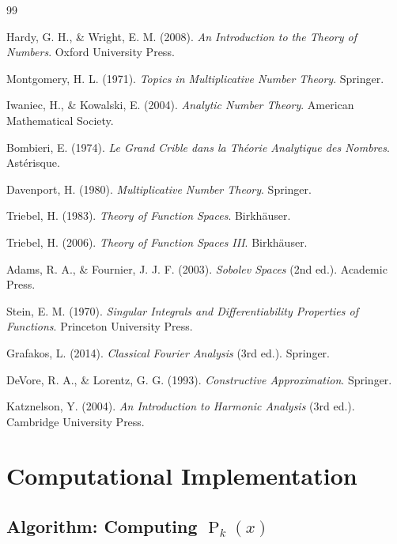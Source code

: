 ﻿\documentclass[12pt,a4paper]{report}
\theoremstyle{plain}
\theoremstyle{definition}
\DeclareMathOperator{\Pk}{P}
\begin{document}

\begin{thebibliography}{99}

Hardy, G. H., \& Wright, E. M. (2008). 
\textit{An Introduction to the Theory of Numbers}. 
Oxford University Press.

Montgomery, H. L. (1971). 
\textit{Topics in Multiplicative Number Theory}. 
Springer.

Iwaniec, H., \& Kowalski, E. (2004). 
\textit{Analytic Number Theory}. 
American Mathematical Society.

Bombieri, E. (1974). 
\textit{Le Grand Crible dans la Th\'eorie Analytique des Nombres}. 
Ast\'erisque.

Davenport, H. (1980). 
\textit{Multiplicative Number Theory}. 
Springer.

Triebel, H. (1983). 
\textit{Theory of Function Spaces}. 
Birkh\"auser.

Triebel, H. (2006). 
\textit{Theory of Function Spaces III}. 
Birkh\"auser.

Adams, R. A., \& Fournier, J. J. F. (2003). 
\textit{Sobolev Spaces} (2nd ed.). 
Academic Press.

Stein, E. M. (1970). 
\textit{Singular Integrals and Differentiability Properties of Functions}. 
Princeton University Press.

Grafakos, L. (2014). 
\textit{Classical Fourier Analysis} (3rd ed.). 
Springer.

DeVore, R. A., \& Lorentz, G. G. (1993). 
\textit{Constructive Approximation}. 
Springer.

Katznelson, Y. (2004). 
\textit{An Introduction to Harmonic Analysis} (3rd ed.). 
Cambridge University Press.

\end{thebibliography}

\appendix

\chapter{Computational Implementation}
\label{app:computation}

\section{Algorithm: Computing $\Pk_k(x)$}
\end{document}
